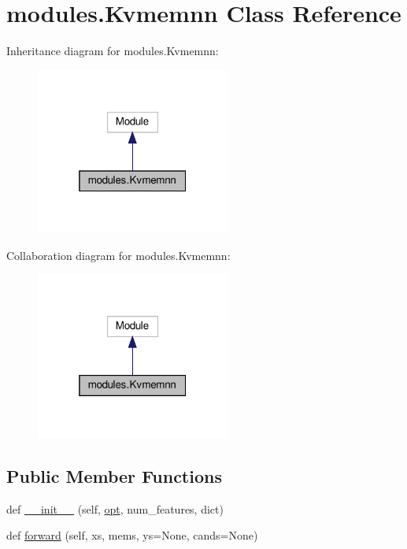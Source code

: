 \hypertarget{classmodules_1_1Kvmemnn}{}\section{modules.\+Kvmemnn Class Reference}
\label{classmodules_1_1Kvmemnn}


Inheritance diagram for modules.\+Kvmemnn\+:
\nopagebreak
\begin{figure}[H]
\begin{center}
\leavevmode
\includegraphics[width=181pt]{classmodules_1_1Kvmemnn__inherit__graph}
\end{center}
\end{figure}


Collaboration diagram for modules.\+Kvmemnn\+:
\nopagebreak
\begin{figure}[H]
\begin{center}
\leavevmode
\includegraphics[width=181pt]{classmodules_1_1Kvmemnn__coll__graph}
\end{center}
\end{figure}
\subsection*{Public Member Functions}
\begin{DoxyCompactItemize}
\item 
def \hyperlink{classmodules_1_1Kvmemnn_ae8fc66293ceb70c96f17600dc367b19c}{\+\_\+\+\_\+init\+\_\+\+\_\+} (self, \hyperlink{classmodules_1_1Kvmemnn_a2877519275db7685b91aa9eb52fc2215}{opt}, num\+\_\+features, dict)
\item 
def \hyperlink{classmodules_1_1Kvmemnn_a85a9be2539bc746cfb162d450067c551}{forward} (self, xs, mems, ys=None, cands=None)
\end{DoxyCompactItemize}
